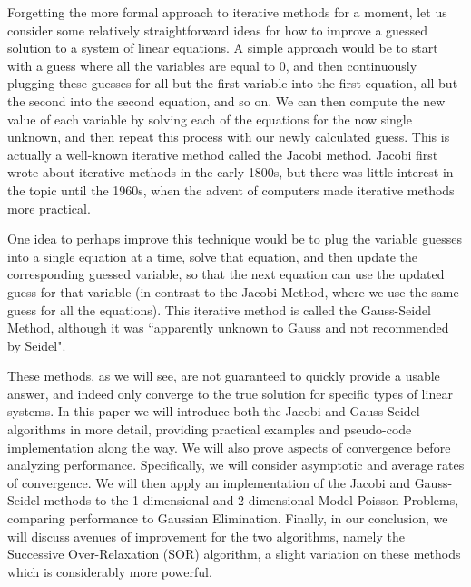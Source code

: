 \documentclass[12pt,letterpaper]{article}
\theoremstyle{definition}
\begin{document}
Forgetting the more formal approach to iterative methods for a moment, let us consider some relatively straightforward ideas for how to improve a guessed solution to a system of linear equations. A simple approach would be to start with a guess where all the variables are equal to 0, and then continuously plugging these guesses for all but the first variable into the first equation, all but the second into the second equation, and so on. We can then compute the new value of each variable by solving each of the equations for the now single unknown, and then repeat this process with our newly calculated guess. This is actually a well-known iterative method called the Jacobi method. Jacobi first wrote about iterative methods in the early 1800s, but there was little interest in the topic until the 1960s, when the advent of computers made iterative methods more practical\cite{JacobiFirstIterativeWriting}.%

One idea to perhaps improve this technique would be to plug the variable guesses into a single equation at a time, solve that equation, and then update the corresponding guessed variable, so that the next equation can use the updated guess for that variable (in contrast to the Jacobi Method, where we use the same guess for all the equations). This iterative method is called the Gauss-Seidel Method, although it was ``apparently unknown to Gauss and not recommended by Seidel"\cite{Strang06}. 

These methods, as we will see, are not guaranteed to quickly provide a usable answer, and indeed only converge to the true solution for specific types of linear systems. 
In this paper we will introduce both the Jacobi and Gauss-Seidel algorithms in more detail, providing practical examples and pseudo-code implementation along the way. We will also prove aspects of convergence before analyzing performance. Specifically, we will consider asymptotic and average rates of convergence. We will then apply an implementation of the Jacobi and Gauss-Seidel methods to the 1-dimensional and 2-dimensional Model Poisson Problems, comparing performance to Gaussian Elimination. Finally, in our conclusion, we will discuss avenues of improvement for the two algorithms, namely the Successive Over-Relaxation (SOR) algorithm, a slight variation on these methods which is considerably more powerful.
\end{document}
